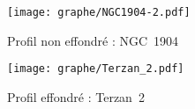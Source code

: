 	\begin{figure}[ht!]
		\begin{minipage}[b]{0.48\linewidth}
			\begin{center}
				\texttt{[image: graphe/NGC1904-2.pdf]}
				\caption{\footnotesize{Profil non effondré : \mbox{NGC 1904}} \label{pas_effondre}}
			\end{center}
		\end{minipage}\hfill
		\begin{minipage}[b]{0.48\linewidth}
			\begin{center}
				\texttt{[image: graphe/Terzan\_2.pdf]}
				\caption{\footnotesize{Profil effondré : \mbox{Terzan 2}} \label{effondre}}
			\end{center}
		\end{minipage}
	\end{figure}

